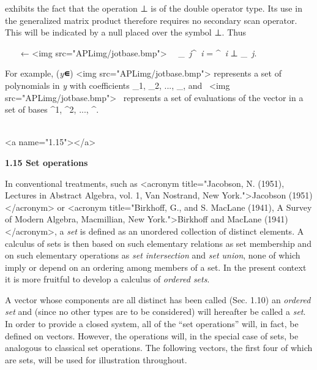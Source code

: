 \par exhibits the fact that the operation ⊥ is of the double operator type. Its use in the generalized matrix product therefore requires no secondary scan operator. This will be indicated by a null placed over the symbol ⊥. Thus

\par \ \ \  ← 
<img src="APLimg/jotbase.bmp">  \ \leftrightarrow\ 
_{\textit{\ j}}^{\textit{\ i}} =
^{\textit{\ i}} ⊥ 
_{\textit{\ j}}.

\par For example, (\textit{y}\textbf{∊}) 
<img src="APLimg/jotbase.bmp">  represents a set of polynomials in \textit{y} with coefficients 
_{1},
_{2}, ...,
\mathbf{X}_{\textit{\nu}}, and
\ <img src="APLimg/jotbase.bmp">\  represents a set of evaluations of the vector  in a set of bases
^{1},
^{2}, ...,
\mathbf{Y}^{\textit{\mu}}.
\\\ 



<a name="1.15"></a>
\par \textbf{1.15 Set operations}

\par In conventional treatments, such as
<acronym title="Jacobson, N. (1951), Lectures in Abstract Algebra, vol. 1, Van Nostrand, New York.">Jacobson (1951)</acronym> or
<acronym title="Birkhoff, G., and S. MacLane (1941), A Survey of Modern Algebra, Macmillian, New York.">Birkhoff and MacLane (1941)</acronym>, a \textit{set} is defined as an unordered collection of distinct elements. A calculus of sets is then based on such elementary relations as set membership and on such elementary operations as
\textit{set intersection} and
\textit{set union}, none of which imply or depend on an ordering among members of a set. In the present context it is more fruitful to develop a calculus of \textit{ordered sets}.

\par A vector whose components are all distinct has been called (Sec. 1.10) an \textit{ordered set} and (since no other types are to be considered) will hereafter be called a \textit{set}. In order to provide a closed system, all of the ``set operations'' will, in fact, be defined on vectors. However, the operations will, in the special case of sets, be analogous to classical set operations. The following vectors, the first four of which are sets, will be used for illustration throughout.

